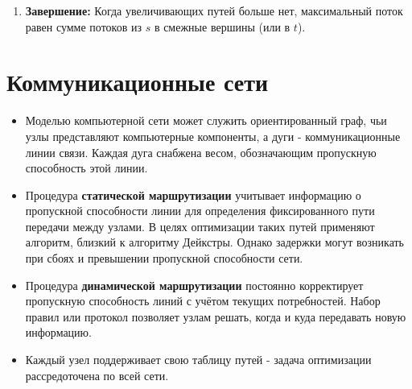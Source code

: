 {\begin{enumerate}
\begin{enumerate}
    \item Для каждого ребра $(u, v) \in p$:
    \begin{itemize}
      \item Увеличить поток: $f(u, v) := f(u, v) + c_f(p)$.
      \item Уменьшить обратный поток: $f(v, u) := f(v, u) - c_f(p)$.
    \end{itemize}
  \end{enumerate}

  \item \textbf{Завершение:}  
  Когда увеличивающих путей больше нет, максимальный поток равен сумме потоков из $s$ в смежные вершины (или в $t$).
\end{enumerate}


\section*{Коммуникационные сети}

\begin{itemize}
  \item Моделью компьютерной сети может служить ориентированный граф, чьи узлы представляют компьютерные компоненты, а дуги - коммуникационные линии связи. Каждая дуга снабжена весом, обозначающим пропускную способность этой линии.

  \item Процедура \textbf{статической маршрутизации} учитывает информацию о пропускной способности линии для определения фиксированного пути передачи между узлами. В целях оптимизации таких путей применяют алгоритм, близкий к алгоритму Дейкстры. Однако задержки могут возникать при сбоях и превышении пропускной способности сети.

  \item Процедура \textbf{динамической маршрутизации} постоянно корректирует пропускную способность линий с учётом текущих потребностей. Набор правил или протокол позволяет узлам решать, когда и куда передавать новую информацию.

  \item Каждый узел поддерживает свою таблицу путей - задача оптимизации рассредоточена по всей сети.
\end{itemize}



    \newpage
}
